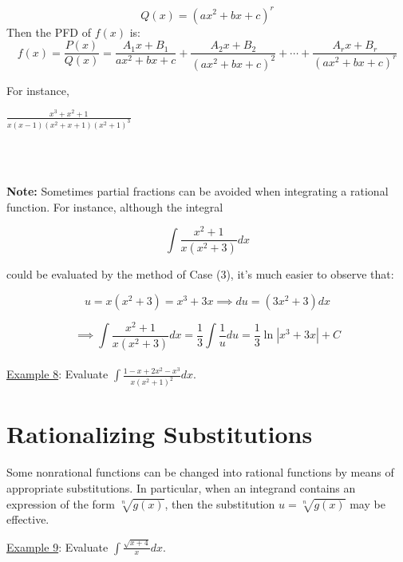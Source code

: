 \documentclass[paper=a4, fontsize=11pt]{scrartcl} %
\numberwithin{equation}{section} %
\numberwithin{figure}{section} %
\numberwithin{table}{section} %
\newcommand{\ds}{\displaystyle}
\begin{document}
\[Q(x)=(ax^2+bx+c)^r\]
Then the PFD of $f(x)$ is:
\[f(x) = \ds\frac{P(x)}{Q(x)} = \ds\frac{A_1x+B_1}{ax^2 + bx + c} + \ds\frac{A_2x+B_2}{(ax^2+bx+c)^2}+\cdots + \ds\frac{A_rx+B_r}{(ax^2+bx+c)^r}\]
\indent

For instance,\\
\indent

$\ds\frac{x^3+x^2+1}{x(x-1)(x^2+x+1)(x^2+1)^3}$\\
\indent\\
\indent

\vspace{10pt}
\indent\\

\vspace{50pt}

\textbf{Note:} Sometimes partial fractions can be avoided when integrating a rational function. For instance, although the integral

\[\ds\int \ds\frac{x^2+1}{x(x^2+3)}dx\]
\indent

could be evaluated by the method of Case (3), it's much easier to observe that:

 \[u=x(x^2+3)=x^3+3x \implies du = (3x^2+3)dx\]
 
 \[\implies \ds\int \ds\frac{x^2+1}{x(x^2+3)}dx = \ds\frac{1}{3} \ds\int \ds\frac{1}{u}du = \ds\frac{1}{3}\ln|x^3+3x| + C\]
 \indent\\
 



\underline{Example 8}: Evaluate $\ds\int \ds\frac{1-x+2x^2-x^3}{x(x^2+1)^2}dx$.\\
\indent

\vspace{3.5in}

\section*{Rationalizing Substitutions}
Some nonrational functions can be changed into rational functions by means of appropriate substitutions. In particular, when an integrand contains an expression of the form $\sqrt[n]{g(x)}$, then the substitution $u=\sqrt[n]{g(x)}$ may be effective.\\
\indent

\underline{Example 9}: Evaluate $\ds\int\ds\frac{\sqrt{x+4}}{x}dx$.\\
\indent











\end{document}
